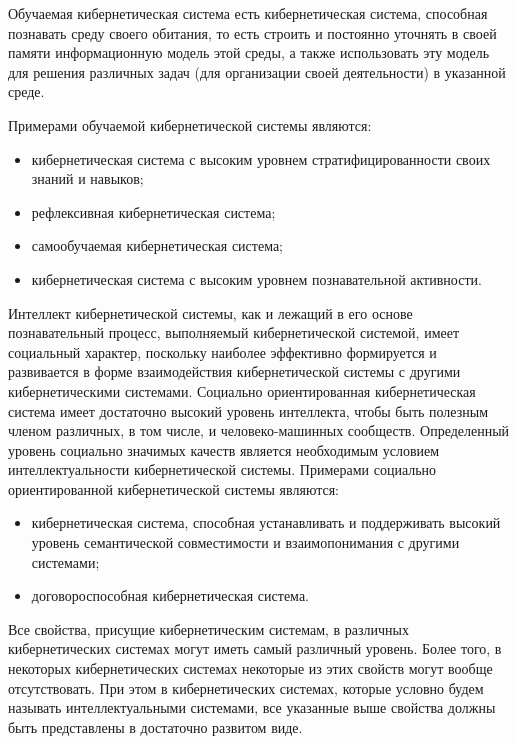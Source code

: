 Обучаемая кибернетическая система есть кибернетическая система, способная познавать среду своего обитания, то есть строить и постоянно уточнять в своей памяти информационную модель этой среды, а также использовать эту модель для решения различных задач (для организации своей деятельности) в указанной среде. 

Примерами обучаемой кибернетической системы являются:
\begin{itemize}
    \item{кибернетическая система с высоким уровнем стратифицированности своих знаний и навыков;}
    \item{рефлексивная кибернетическая система;}
    \item{самообучаемая кибернетическая система;}
    \item{кибернетическая система с высоким уровнем познавательной активности.}
\end{itemize}

Интеллект кибернетической системы, как и лежащий в его основе познавательный процесс, выполняемый кибернетической системой, имеет социальный характер, поскольку наиболее эффективно формируется и развивается в форме взаимодействия кибернетической системы с другими кибернетическими системами.
Социально ориентированная кибернетическая система имеет достаточно высокий уровень интеллекта, чтобы быть полезным членом различных, в том числе, и человеко-машинных сообществ.
Определенный уровень социально значимых качеств является необходимым условием интеллектуальности кибернетической системы.
Примерами социально ориентированной кибернетической системы являются:
\begin{itemize}
    \item{кибернетическая система, способная устанавливать и поддерживать высокий уровень семантической совместимости и взаимопонимания с другими системами;}
    \item{договороспособная кибернетическая система.}
\end{itemize}

Все свойства, присущие кибернетическим системам, в различных кибернетических системах могут иметь самый различный уровень.
Более того, в некоторых кибернетических системах некоторые из этих свойств могут вообще отсутствовать.
При этом в кибернетических системах, которые условно будем называть интеллектуальными системами, все указанные выше свойства должны быть представлены в достаточно развитом виде.